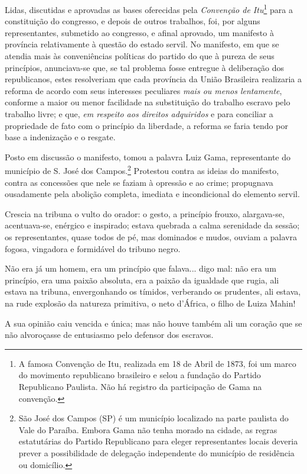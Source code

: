 Lidas, discutidas e aprovadas as bases oferecidas pela \emph{Convenção
de Itu}\footnote{A famosa Convenção de Itu, realizada em 18 de Abril
  de 1873, foi um marco do movimento republicano brasileiro e selou a
  fundação do Partido Republicano Paulista. Não há registro da
  participação de Gama na convenção.} para a constituição do congresso,
e depois de outros trabalhos, foi, por alguns representantes, submetido
ao congresso, e afinal aprovado, um manifesto à província relativamente
à questão do estado servil. No manifesto, em que se atendia mais às
conveniências políticas do partido do que à pureza de seus princípios,
anunciava-se que, se tal problema fosse entregue à deliberação dos
republicanos, estes resolveriam que cada província da União Brasileira
realizaria a reforma de acordo com seus interesses peculiares \emph{mais
ou menos lentamente}, conforme a maior ou menor facilidade na
substituição do trabalho escravo pelo trabalho livre; e que, \emph{em
respeito aos direitos adquiridos} e para conciliar a propriedade de fato
com o princípio da liberdade, a reforma se faria tendo por base a
indenização e o resgate.

Posto em discussão o manifesto, tomou a palavra Luiz Gama, representante
do município de S. José dos Campos.\footnote{São José dos Campos (SP)
  é um município localizado na parte paulista do Vale do Paraíba. Embora
  Gama não tenha morado na cidade, as regras estatutárias do Partido
  Republicano para eleger representantes locais deveria prever a
  possibilidade de delegação independente do município de residência ou
  domicílio.} Protestou contra as ideias do manifesto, contra as
concessões que nele se faziam à opressão e ao crime; propugnava
ousadamente pela abolição completa, imediata e incondicional do elemento
servil.

Crescia na tribuna o vulto do orador: o gesto, a princípio frouxo,
alargava-se, acentuava-se, enérgico e inspirado; estava quebrada a calma
serenidade da sessão; os representantes, quase todos de pé, mas
dominados e mudos, ouviam a palavra fogosa, vingadora e formidável do
tribuno negro.

Não era já um homem, era um princípio que falava... digo mal: não era um
princípio, era uma paixão absoluta, era a paixão da igualdade que rugia,
ali estava na tribuna, envergonhando os tímidos, verberando os
prudentes, ali estava, na rude explosão da natureza primitiva, o neto
d'África, o filho de Luiza Mahin!

A sua opinião caiu vencida e única; mas não houve também ali um coração
que se não alvoroçasse de entusiasmo pelo defensor dos escravos.

